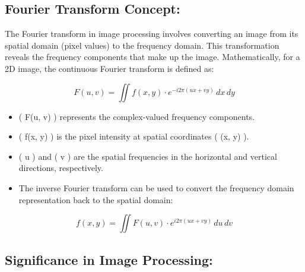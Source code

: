 \documentclass[11pt]{article}
\providecommand{\tightlist}{%
      \setlength{\itemsep}{0pt}\setlength{\parskip}{0pt}}
\begin{document}
\hypertarget{fourier-transform-concept}{%
\subsection{Fourier Transform
Concept:}\label{fourier-transform-concept}}

The Fourier transform in image processing involves converting an image
from its spatial domain (pixel values) to the frequency domain. This
transformation reveals the frequency components that make up the image.
Mathematically, for a 2D image, the continuous Fourier transform is
defined as:

\[ F(u, v) = \iint f(x, y) \cdot e^{-i 2\pi (ux + vy)} \,dx\,dy \]

\begin{itemize}
\tightlist
\item
  ( F(u, v) ) represents the complex-valued frequency components.
\item
  ( f(x, y) ) is the pixel intensity at spatial coordinates ( (x, y) ).
\item
  ( u ) and ( v ) are the spatial frequencies in the horizontal and
  vertical directions, respectively.
\item
  The inverse Fourier transform can be used to convert the frequency
  domain representation back to the spatial domain:
\end{itemize}

\[ f(x, y) = \iint F(u, v) \cdot e^{i 2\pi (ux + vy)} \,du\,dv \]

\hypertarget{significance-in-image-processing}{%
\subsection{Significance in Image
Processing:}\label{significance-in-image-processing}}
\end{document}
